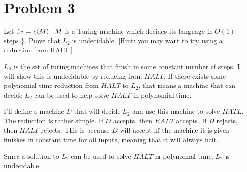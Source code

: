 \documentclass[12pt]{article}
\begin{document}
\section*{Problem 3}

\begin{questionbox}
	Let $L_2 = \{ \braket{M} \mid M $ is a Turing machine which decides its language in $O(1)$ steps $\}$. Prove that
	$L_2$ is undecidable. [Hint: you may want to try using a reduction from HALT.]
\end{questionbox}


$L_2$ is the set of turing machines that finish in some constant number of steps. I will show this is undecidable by reducing from $HALT$. If there exists some polynomial time reduction from $HALT$ to $L_2$, that means a machine that can decide $L_2$ can be used to help solve $HALT$ in polynomial time.

I'll define a machine $D$ that will decide $L_2$ and use this machine to solve $HATL$. The reduction is rather simple. If $D$ accepts, then $HALT$ accepts. If $D$ rejects, then $HALT$ rejects. This is because $D$ will accept iff the machine it is given finishes in constant time for all inputs, meaning that it will always halt.

Since a solution to $L_2$ can be used to solve $HALT$ in polynomial time, $L_2$ is undecidable.
\end{document}
